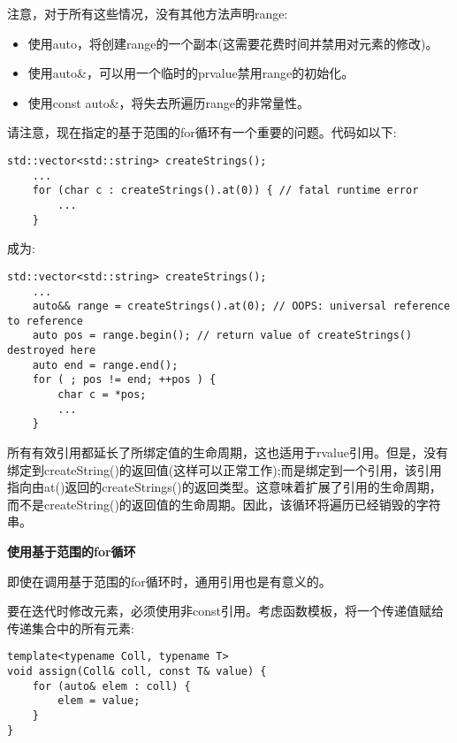 注意，对于所有这些情况，没有其他方法声明range:\par

\begin{itemize}
	\item 使用auto，将创建range的一个副本(这需要花费时间并禁用对元素的修改)。
	\item 使用auto\&，可以用一个临时的prvalue禁用range的初始化。
	\item 使用const auto\&，将失去所遍历range的非常量性。
\end{itemize}

请注意，现在指定的基于范围的for循环有一个重要的问题。代码如以下:\par

\begin{lstlisting}[caption={}]
	std::vector<std::string> createStrings();
	...
	for (char c : createStrings().at(0)) { // fatal runtime error
		...
	}
\end{lstlisting}

成为:\par

\begin{lstlisting}[caption={}]
	std::vector<std::string> createStrings();
	...
	auto&& range = createStrings().at(0); // OOPS: universal reference to reference
	auto pos = range.begin(); // return value of createStrings() destroyed here
	auto end = range.end();
	for ( ; pos != end; ++pos ) {
		char c = *pos;
		...
	}
\end{lstlisting}

所有有效引用都延长了所绑定值的生命周期，这也适用于rvalue引用。但是，没有绑定到createString()的返回值(这样可以正常工作);而是绑定到一个引用，该引用指向由at()返回的createStrings()的返回类型。这意味着扩展了引用的生命周期，而不是createString()的返回值的生命周期。因此，该循环将遍历已经销毁的字符串。\par

\hspace*{\fill} \par %
\textbf{使用基于范围的for循环}

即使在调用基于范围的for循环时，通用引用也是有意义的。\par

要在迭代时修改元素，必须使用非const引用。考虑函数模板，将一个传递值赋给传递集合中的所有元素:\par

\begin{lstlisting}[caption={}]
template<typename Coll, typename T>
void assign(Coll& coll, const T& value) {
	for (auto& elem : coll) {
		elem = value;
	}
}
\end{lstlisting}

